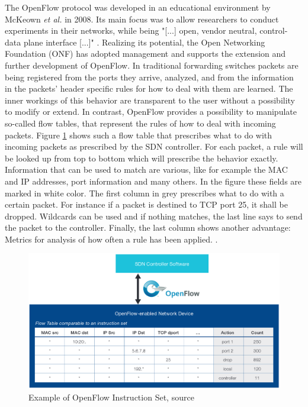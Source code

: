 The OpenFlow protocol was developed in an educational environment by McKeown \textit{et al.} \cite{mckeown2008openflow} in 2008. Its main focus was to allow researchers to conduct experiments in their networks, while being "[...] open, vendor neutral, control-data plane interface [...]" \cite{berde2014onos}. Realizing its potential, the Open Networking Foundation (ONF) has adopted management and supports the extension and further development of OpenFlow.
In traditional forwarding switches packets are being registered from the ports they arrive, analyzed, and from the information in the packets' header specific rules for how to deal with them are learned. The inner workings of this behavior are transparent to the user without a possibility to modify or extend. In contrast, OpenFlow provides a possibility to manipulate so-called flow tables, that represent the rules of how to deal with incoming packets. 
Figure \ref{img:of} shows such a flow table that prescribes what to do with incoming packets as prescribed by the SDN controller. For each packet, a rule will be looked up from top to bottom which will prescribe the behavior exactly.  Information that can be used to match are various, like for example the MAC and IP addresses, port information and many others. In the figure these fields are marked in white color. The first column in grey prescribes what to do with a certain packet. For instance if a packet is destined to TCP port 25, it shall be dropped. Wildcards can be used and if nothing matches, the last line says to send the packet to the controller. Finally, the last column shows another advantage: Metrics for analysis of how often a rule has been applied. 
\cite{mckeown2008openflow}. 

\begin{figure}[h]
	\centering
	\includegraphics[width=1\linewidth]{images/of.png}
	\caption{Example of OpenFlow Instruction Set, source \cite{ofWhitePaper}}
	\label{img:of}
\end{figure}

